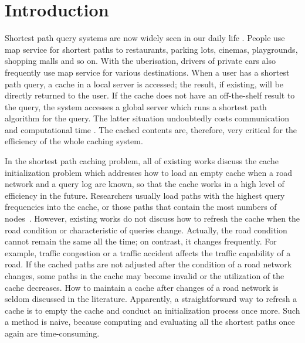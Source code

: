 \section{Introduction}
Shortest path query systems are now widely seen in our daily life \citep{wu2012shortest,potamias2009fast,wei2010tedi,liu2011generalization,
cheng2012efficient}.
People use map service for shortest paths to restaurants, parking lots, cinemas, playgrounds, shopping malls and so on.
With the uberisation, drivers of private cars also frequently use map service for various destinations.
When a user has a shortest path query, a cache in a local server is accessed; the result, if existing, will be directly returned to the user. If the cache does not have an off-the-shelf result to the query, the system accesses a global server which runs a shortest path algorithm for the query. The latter situation undoubtedly costs communication and computational time \citep{altingovde2009cost,baeza2007impact,Kriegel2008Hierarchical,gan2009improved,markatos2001caching}. The cached contents are, therefore, very critical for the efficiency of the whole caching system.

In the shortest path caching problem, all of existing works discuss the cache initialization problem which addresses how to load an empty cache when a road network and a query log are known, so that the cache works in a high level of efficiency in the future. Researchers usually load paths with the highest query frequencies into the cache, or those paths that contain the most numbers of nodes~\citep{thomsen2012effective,li2013}.
However, existing works do not discuss how to refresh the cache when the road condition or characteristic of queries change.
Actually, the road condition cannot remain the same all the time; on contrast, it changes frequently.
For example, traffic congestion or a traffic accident affects the traffic capability of a road.
If the cached paths are not adjusted after the condition of a road network changes, some paths in the cache may become invalid or the utilization of the cache decreases.
How to maintain a cache after changes of a road network is seldom discussed in the literature.
Apparently, a straightforward way to refresh a cache is to empty the cache and conduct an initialization process once more. Such a method is naive, because computing and evaluating all the shortest paths once again are time-consuming.

